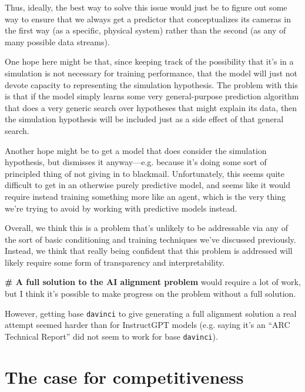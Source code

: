 \documentclass[
  onecolumn,
  natbib,
]{miri-tech-article}
\newenvironment{modelquote}%
  {\list{}{\leftmargin=0.3in\rightmargin=0.3in}\item[]}%
  {\endlist}
\begin{document}
Thus, ideally, the best way to solve this issue would just be to figure out some way to ensure that we always get a predictor that conceptualizes its cameras in the first way (as a specific, physical system) rather than the second (as any of many possible data streams).

One hope here might be that, since keeping track of the possibility that it's in a simulation is not necessary for training performance, that the model will just not devote capacity to representing the simulation hypothesis. The problem with this is that if the model simply learns some very general-purpose prediction algorithm that does a very generic search over hypotheses that might explain its data, then the simulation hypothesis will be included just as a side effect of that general search.

Another hope might be to get a model that does consider the simulation hypothesis, but dismisses it anyway---e.g. because it's doing some sort of principled thing of not giving in to blackmail. Unfortunately, this seems quite difficult to get in an otherwise purely predictive model, and seems like it would require instead training something more like an agent, which is the very thing we're trying to avoid by working with predictive models instead.

Overall, we think this is a problem that's unlikely to be addressable via any of the sort of basic conditioning and training techniques we've discussed previously. Instead, we think that really being confident that this problem is addressed will likely require some form of transparency and interpretability.

\begin{modelquote}
\textbf{\# A full solution to the AI alignment problem} would require a lot of work, but I think it's possible to make progress on the problem without a full solution.
\end{modelquote}

     However, getting base \texttt{davinci} to give generating a full alignment solution a real attempt seemed harder than for InstructGPT models (e.g. saying it's an ``ARC Technical Report'' did not seem to work for base \texttt{davinci}).




\section{The case for competitiveness}
\label{sec:3}
\end{document}
